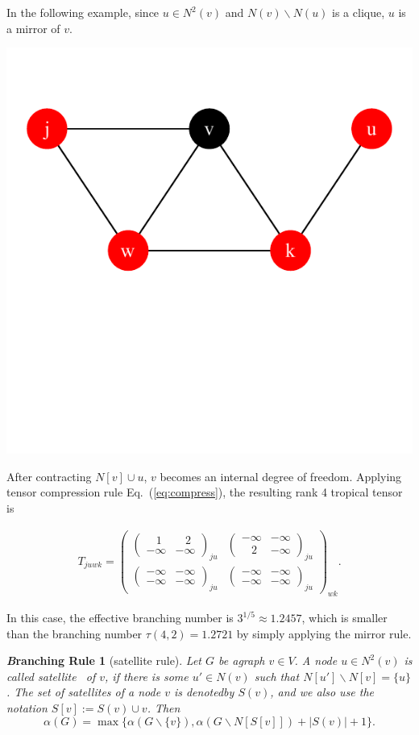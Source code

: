 \documentclass{article}
\newcommand{\<}{\langle}
\renewcommand{\>}{\rangle}
\renewcommand{\cite}[1]{{\citep{#1}}}
\newcommand{\Eq}[1]{Eq.~(\ref{#1})}
\newtheorem{corollary}{\textit Branching Rule}
\theoremstyle{definition}\newtheorem{definition}{\textit{Definition}}
\begin{document}
In the following example, since $u\in N^2(v)$ and $N(v) \backslash N(u)$ is a clique, $u$ is a mirror of $v$.

\centerline{\includegraphics[width=0.4\columnwidth,trim={0 3.5cm 0 1cm},clip]{../notebooks/mirror.pdf}}

After contracting $N[v]\cup u$, $v$ becomes an internal degree of freedom.
Applying tensor compression rule \Eq{eq:compress}, the resulting rank 4 tropical tensor is

\begin{align}
    T_{juwk} = \left(\begin{matrix}
        \left(\begin{matrix}
        ~~~~1 & ~~~~2 \\
        -\infty & -\infty
        \end{matrix}\right)_{ju}&
        \left(\begin{matrix}
        -\infty & -\infty \\
        ~~~~2 & -\infty
        \end{matrix}\right)_{ju}\\
        \left(\begin{matrix}
        -\infty & -\infty \\
        -\infty & -\infty
        \end{matrix}\right)_{ju} &
        \left(\begin{matrix}
        -\infty & -\infty \\
        -\infty & -\infty
        \end{matrix}\right)_{ju}
    \end{matrix}\right)_{wk}.
\end{align}

In this case, the effective branching number is $3^{1/5}\approx 1.2457$,
which is smaller than the branching number $\tau(4, 2) = 1.2721$ by simply applying the mirror rule.

\begin{corollary}[satellite rule] %
Let $G$ be agraph $v \in V$. A node $u \in N^2(v)$ is called satellite~\cite{Kneis2009} of $v$, if there is some $u' \in N(v)$ such that $N[u'] \backslash N[v] = \{u\}$.
The set of satellites of a node $v$ is denotedby $S(v)$, and we also use the notation $S[v] := S(v) \cup {v}$. Then 
\begin{equation}
\alpha(G) = \max\{\alpha(G \backslash \{v\}), \alpha(G \backslash N[S[v]]) + |S(v)| + 1\}.
\end{equation}
\end{corollary}
\end{document}

